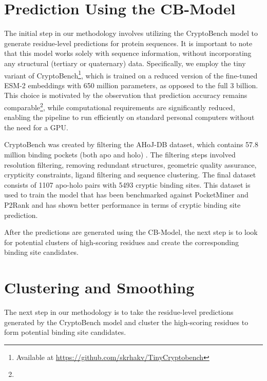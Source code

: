 \section{Prediction Using the CB-Model}
\label{sec:prediction}

The initial step in our methodology involves utilizing the CryptoBench \cite{vskrhak2025cryptobench} model to generate residue-level predictions for protein sequences. It is important to note that this model works solely with sequence information, without incorporating any structural (tertiary or quaternary) data. Specifically, we employ the tiny variant of CryptoBench\footnote{Available at \url{https://github.com/skrhakv/TinyCryptobench}}, which is trained on a reduced version of the fine-tuned ESM-2 embeddings \cite{lin2022language} with 650 million parameters, as opposed to the full 3 billion. This choice is motivated by the observation that prediction accuracy remains comparable\footnote{}, while computational requirements are significantly reduced, enabling the pipeline to run efficiently on standard personal computers without the need for a GPU.

CryptoBench was created by filtering the AHoJ-DB \cite{feidakis2024ahoj} dataset, which contains 57.8 million binding pockets (both apo and holo) \cite{apoholo-stats}. The filtering steps involved resolution filtering, removing redundant structures, geometric quality assurance, crypticity constraints, ligand filtering and sequence clustering. The final dataset consists of 1107 apo-holo pairs with 5493 cryptic binding sites. This dataset is used to train the model that has been benchmarked against PocketMiner \cite{meller2023predicting} and P2Rank \cite{krivak2018p2rank} and has shown better performance in terms of cryptic binding site prediction.

After the predictions are generated using the CB-Model, the next step is to look for potential clusters of high-scoring residues and create the corresponding binding site candidates.

\section{Clustering and Smoothing}
\label{sec:clustering}

The next step in our methodology is to take the residue-level predictions generated by the CryptoBench model and cluster the high-scoring residues to form potential binding site candidates.

